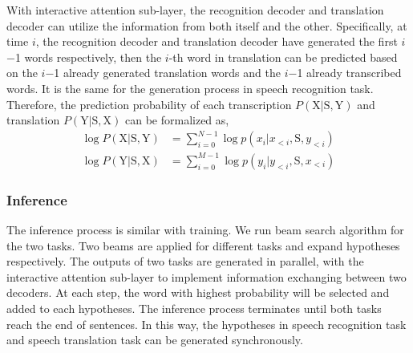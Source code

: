 \documentclass[letterpaper]{article} %
\begin{document}
With interactive attention sub-layer, the recognition decoder and translation decoder can utilize the information from both itself and the other. Specifically, at time $i$, the recognition decoder and translation decoder have generated the first $i$$-$1 words respectively, then the $i$-th word in translation can be predicted based on the $i$$-$1 already generated translation words and the $i$$-$1 already transcribed words. It is the same for the generation process in speech recognition task. Therefore, the prediction probability of each transcription $ P(\mathrm{X}|\mathrm{S},\mathrm{Y})$ and translation $ P(\mathrm{Y}|\mathrm{S},\mathrm{X})$ can be formalized as,
\begin{align}
\log P(\mathrm{X}|\mathrm{S},\mathrm{Y}) &= \sum_{i=0}^{N-1} \log p(x_{i}|x_{<i},\mathrm{S},y_{<i}) \\
\log P(\mathrm{Y}|\mathrm{S},\mathrm{X}) &= \sum_{i=0}^{M-1} \log p(y_{i}|y_{<i},\mathrm{S},x_{<i})
\end{align} 

\subsubsection{Inference}
The inference process is similar with training. We run beam search algorithm for the two tasks. Two beams are applied for different tasks and expand hypotheses respectively. The outputs of two tasks are generated in parallel, with the interactive attention sub-layer to implement information exchanging between two decoders. At each step, the word with highest probability will be selected and added to each hypotheses. The inference process terminates until both tasks reach the end of sentences.  In this way, the hypotheses in speech recognition task and speech translation task can be generated synchronously. 
\end{document}
